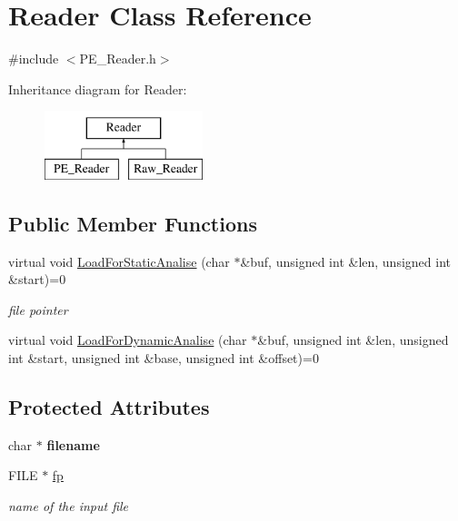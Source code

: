 \hypertarget{classReader}{
\section{Reader Class Reference}
\label{classReader}
}


{\ttfamily \#include $<$PE\_\-Reader.h$>$}

Inheritance diagram for Reader:\begin{figure}[H]
\begin{center}
\leavevmode
\includegraphics[height=2cm]{classReader}
\end{center}
\end{figure}
\subsection*{Public Member Functions}
\begin{DoxyCompactItemize}
\item 
virtual void \hyperlink{classReader_a48b1d822c048d481388fe05ff90b10f3}{LoadForStaticAnalise} (char $\ast$\&buf, unsigned int \&len, unsigned int \&start)=0
\begin{DoxyCompactList}\small\item\em file pointer \item\end{DoxyCompactList}\item 
virtual void \hyperlink{classReader_a0fe4ac206880263e042c5277370c679b}{LoadForDynamicAnalise} (char $\ast$\&buf, unsigned int \&len, unsigned int \&start, unsigned int \&base, unsigned int \&offset)=0
\end{DoxyCompactItemize}
\subsection*{Protected Attributes}
\begin{DoxyCompactItemize}
\item 
\hypertarget{classReader_a583b5c9cc809c6630c9cade472c6f50e}{
char $\ast$ {\bfseries filename}}
\label{classReader_a583b5c9cc809c6630c9cade472c6f50e}

\item 
\hypertarget{classReader_ad8968e3f303fe580f2ab5077ae8be377}{
FILE $\ast$ \hyperlink{classReader_ad8968e3f303fe580f2ab5077ae8be377}{fp}}
\label{classReader_ad8968e3f303fe580f2ab5077ae8be377}

\begin{DoxyCompactList}\small\item\em name of the input file \item\end{DoxyCompactList}\end{DoxyCompactItemize}



